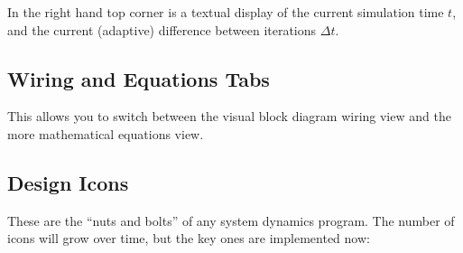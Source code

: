 In the right hand top corner is a textual display of the current
simulation time $t$, and the current (adaptive) difference between
iterations $\Delta t$.

\subsection{Wiring and Equations Tabs}
\label{WiringEquationsTab}\label{tabs:wiring}


This allows you to switch between the visual block diagram wiring view and the more 
mathematical equations view.

\subsection{Design Icons}


These are the ``nuts and bolts'' of any system dynamics program. The
number of icons will grow over time, but the key ones are implemented
now: 

